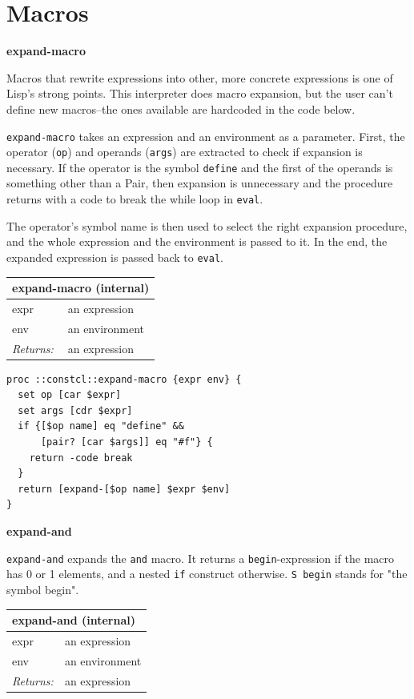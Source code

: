\documentclass[twoside,9pt]{report}
\begin{document}
\section{Macros}
\label{macros}

\textbf{expand-macro}


Macros that rewrite expressions into other, more concrete expressions is one of Lisp's strong points. This interpreter does macro expansion, but the user can't define new macros--the ones available are hardcoded in the code below.


\texttt{expand-macro} takes an expression and an environment as a parameter. First, the operator (\texttt{op}) and operands (\texttt{args}) are extracted to check if expansion is necessary. If the operator is the symbol \texttt{define} and the first of the operands is something other than a Pair, then expansion is unnecessary and the procedure returns with a code to break the while loop in \texttt{eval}.


The operator's symbol name is then used to select the right expansion procedure, and the whole expression and the environment is passed to it. In the end, the expanded expression is passed back to \texttt{eval}.

\begin{tabular}{ |l l| }
\hline
\multicolumn{2}{|l|}{expand-macro (internal)} \\
\hline
expr & an expression \\
env & an environment \\
\textit{Returns:} & an expression \\
\hline
\end{tabular}

\noindent\makebox[\linewidth]{\rule{\linewidth}{0.4pt}}
\begin{lstlisting}
proc ::constcl::expand-macro {expr env} {
  set op [car $expr]
  set args [cdr $expr]
  if {[$op name] eq "define" &&
      [pair? [car $args]] eq "#f"} {
    return -code break
  }
  return [expand-[$op name] $expr $env]
}
\end{lstlisting}
\noindent\makebox[\linewidth]{\rule{\linewidth}{0.4pt}}

\textbf{expand-and}


\texttt{expand-and} expands the \texttt{and} macro. It returns a \texttt{begin}-expression if the macro has 0 or 1 elements, and a nested \texttt{if} construct otherwise. \texttt{S begin} stands for "the symbol begin".

\begin{tabular}{ |l l| }
\hline
\multicolumn{2}{|l|}{expand-and (internal)} \\
\hline
expr & an expression \\
env & an environment \\
\textit{Returns:} & an expression \\
\hline
\end{tabular}
\end{document}
